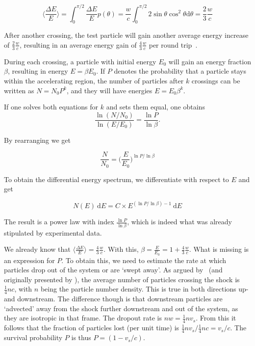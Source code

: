 \begin{equation}
    \bigg\langle \frac{\Delta E}{E} \bigg\rangle = \int_0^{\pi/2} \frac{\Delta E}{E} p(\theta) = \frac{w}{c} \int_0^{\pi/2} 2 \sin{\theta} \cos^2{\theta}  \text{d}\theta = \frac{2}{3}\frac{w}{c}
\end{equation}

After another crossing, the test particle will gain another average energy increase of $\frac{2}{3}\frac{w}{c}$, resulting in an average energy gain of $\frac{4}{3}\frac{w}{c}$ per round trip~\cite{Longair2011}.

During each crossing, a particle with initial energy $E_0$ will gain an energy fraction $\beta$, resulting in energy $E=\beta E_0$. If $P$ denotes the probability that a particle stays within the accelerating region, the number of particles after $k$ crossings can be written as $N=N_0 P^k $, and they will have energies $E=E_0\beta^k$.

If one solves both equations for $k$ and sets them equal, one obtains
\begin{equation}
    \frac{\ln (N/N_0)}{\ln (E/E_0)} = \frac{\ln P}{\ln \beta}.
\end{equation}

By rearranging we get

\begin{equation}
    \frac{N}{N_0} = \bigg(\frac{E}{E_0}\bigg)^{\ln P / \ln \beta}
\end{equation}

To obtain the differential energy spectrum, we differentiate with respect to $E$ and get

\begin{equation}
    \label{eqn:diff_e_spec}
    N(E)~\text{d} E = C\times E^{(\ln P/\ln\beta)-1}~\text{d} E
\end{equation}

The result is a power law with index $\frac{\ln P}{\ln \beta}$, which is indeed what was already stipulated by experimental data.

We already know that $\big\langle\frac{\Delta E}{E}\big\rangle = \frac{4}{3}\frac{w}{c}$. With this, $\beta = \frac{E}{E_0} = 1 + \frac{4}{3}\frac{w}{c}$. What is missing is an expression for $P$. To obtain this, we need to estimate the rate at which particles drop out of the system or are `swept away'. As argued by~\cite{Longair2011} (and originally presented by ), the average number of particles crossing the shock is $\frac{1}{4} n c$, with $n$ being the particle number density. This is true in both directions up- and downstream. The difference though is that downstream particles are `advected' away from the shock further downstream and out of the system, as they are isotropic in that frame. The dropout rate is $n w=\frac{1}{4}nv_s$. From this it follows that the fraction of particles lost (per unit time) is $\frac{1}{4} n v_s/\frac{1}{4}nc = v_s/c$. The survival probability $P$ is thus $P=(1-v_s/c)$.

